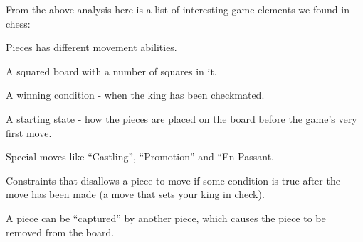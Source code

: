 
From the above analysis here is a list of interesting game elements we found in chess:
\begin{dlist}
\item Pieces has different movement abilities.
\item A squared board with a number of squares in it.
\item A winning condition - when the king has been checkmated.
\item A starting state - how the pieces are placed on the board before the game's very first move.
\item Special moves like ``Castling'', ``Promotion'' and ``En Passant.
\item Constraints that disallows a piece to move if some condition is true after the move has been made (a move that sets your king in check).
\item A piece can be ``captured'' by another piece, which causes the piece to be removed from the board.
\end{dlist}

